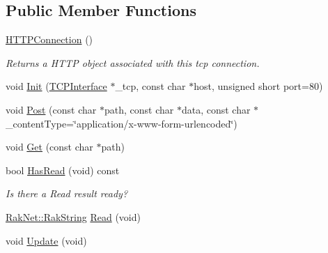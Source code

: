 \subsection*{Public Member Functions}
\begin{DoxyCompactItemize}
\item 
\hypertarget{class_rak_net_1_1_h_t_t_p_connection_ad2b619ad773b90f4e76cf4cfd0e8b99d}{\hyperlink{class_rak_net_1_1_h_t_t_p_connection_ad2b619ad773b90f4e76cf4cfd0e8b99d}{H\-T\-T\-P\-Connection} ()}\label{class_rak_net_1_1_h_t_t_p_connection_ad2b619ad773b90f4e76cf4cfd0e8b99d}

\begin{DoxyCompactList}\small\item\em Returns a H\-T\-T\-P object associated with this tcp connection. \end{DoxyCompactList}\item 
void \hyperlink{class_rak_net_1_1_h_t_t_p_connection_a141477df97a0f86b6f2d4d3a95a1baf2}{Init} (\hyperlink{class_rak_net_1_1_t_c_p_interface}{T\-C\-P\-Interface} $\ast$\-\_\-tcp, const char $\ast$host, unsigned short port=80)
\item 
void \hyperlink{class_rak_net_1_1_h_t_t_p_connection_ae13eeb1d5063b5bb3e083c9ecd217708}{Post} (const char $\ast$path, const char $\ast$data, const char $\ast$\-\_\-content\-Type=\char`\"{}application/x-\/www-\/form-\/urlencoded\char`\"{})
\item 
void \hyperlink{class_rak_net_1_1_h_t_t_p_connection_ac853da0128efafd138d379beb9e4de67}{Get} (const char $\ast$path)
\item 
\hypertarget{class_rak_net_1_1_h_t_t_p_connection_a46f1fd6bec3066d45192381e2c664091}{bool \hyperlink{class_rak_net_1_1_h_t_t_p_connection_a46f1fd6bec3066d45192381e2c664091}{Has\-Read} (void) const }\label{class_rak_net_1_1_h_t_t_p_connection_a46f1fd6bec3066d45192381e2c664091}

\begin{DoxyCompactList}\small\item\em Is there a Read result ready? \end{DoxyCompactList}\item 
\hyperlink{class_rak_net_1_1_rak_string}{Rak\-Net\-::\-Rak\-String} \hyperlink{class_rak_net_1_1_h_t_t_p_connection_ac932aee66fc03a34e00bd0e3d956f499}{Read} (void)
\item 
\hypertarget{class_rak_net_1_1_h_t_t_p_connection_a0e4fadf7bf4a758b088d79ad436bd28c}{void \hyperlink{class_rak_net_1_1_h_t_t_p_connection_a0e4fadf7bf4a758b088d79ad436bd28c}{Update} (void)}\label{class_rak_net_1_1_h_t_t_p_connection_a0e4fadf7bf4a758b088d79ad436bd28c}


\end{DoxyCompactItemize}
